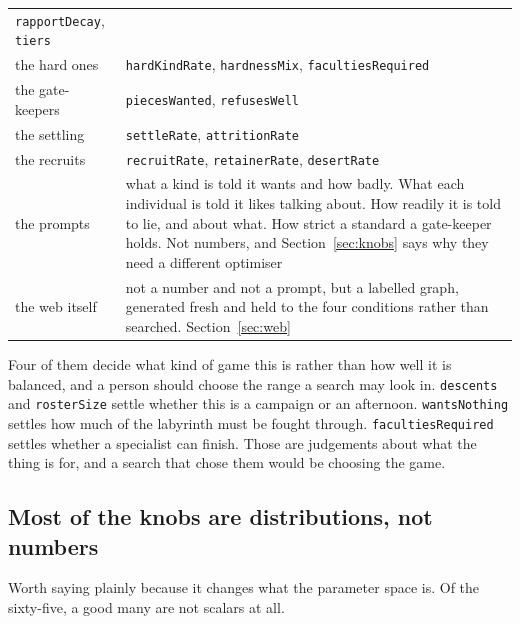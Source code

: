 \documentclass[11pt,a4paper]{article}
\begin{document}
\begin{center}
\begin{tabular}{@{}l@{\hspace{3mm}}>{\raggedright\arraybackslash}p{}@{}}
\texttt{rapportDecay}, \texttt{tiers} \\[1mm]
the hard ones &
\texttt{hardKindRate}, \texttt{hardnessMix}, \texttt{facultiesRequired} \\[1mm]
the gate-keepers &
\texttt{piecesWanted}, \texttt{refusesWell} \\[1mm]
the settling &
\texttt{settleRate}, \texttt{attritionRate} \\[1mm]
the recruits &
\texttt{recruitRate}, \texttt{retainerRate}, \texttt{desertRate} \\[1mm]
\midrule
the prompts &
what a kind is told it wants and how badly. What each individual is told it likes talking about.
How readily it is told to lie, and about what. How strict a standard a gate-keeper holds. Not numbers,
and Section~\ref{sec:knobs} says why they need a different optimiser \\[1mm]
the web itself &
not a number and not a prompt, but a labelled graph, generated fresh and held to the four
conditions rather than searched. Section~\ref{sec:web} \\
\bottomrule
\end{tabular}
\end{center}
\normalsize

\begin{sectionbox}
Four of them decide what kind of game this is rather than how well it is balanced, and a person
should choose the range a search may look in. \texttt{descents} and \texttt{rosterSize} settle
whether this is a campaign or an afternoon. \texttt{wantsNothing} settles how much of the labyrinth
must be fought through. \texttt{facultiesRequired} settles whether a specialist can finish. Those
are judgements about what the thing is for, and a search that chose them would be choosing the
game.
\end{sectionbox}

\subsection{Most of the knobs are distributions, not numbers}
\label{sec:prob}

Worth saying plainly because it changes what the parameter space is. Of the sixty-five, a good many
are not scalars at all.
\end{document}
